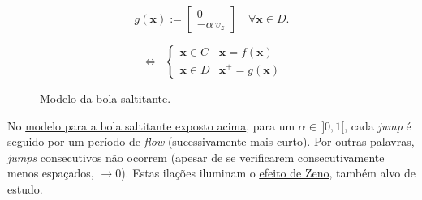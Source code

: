 \vspace{-0.75em}
$$
    g(\pmb{x}) := \begin{bmatrix} 0 \\ -\alpha\,v_z \end{bmatrix} \quad \forall \pmb{x} \in D\text{.}
$$
\vspace{-1.75em}
\begin{figure}[H]
    \begin{minipage}[c]{0.4\linewidth}
    \end{minipage}\hfill
    \begin{minipage}[c]{0.45\linewidth}
    $$
        \:\pmb{\iff}\;\:
        \begin{cases}
            \pmb{x} \in C & \dot{\pmb{x}} = f(\pmb{x}) \\
            \pmb{x} \in D & \pmb{x}^{+} = g(\pmb{x}) 
        \end{cases}
    $$
    \end{minipage}
    \caption{\underline{Modelo da bola saltitante}.}
    \label{fig:bouncing-ball}
\end{figure}

\vspace{-0.75em}
\noindent No \hyperref[fig:bouncing-ball]{modelo para a bola saltitante exposto acima}, para um $\alpha \in\, ]0,1[$, cada \textit{jump} é seguido por um período de \textit{flow} (sucessivamente mais curto). Por outras palavras, \textit{jumps} consecutivos não ocorrem\cite{Goebel2012-ho} (apesar de se verificarem consecutivamente menos espaçados, $\to 0$). Estas ilações iluminam o \hyperref[def:zeno]{\underline{efeito de Zeno}}, também alvo de estudo.

